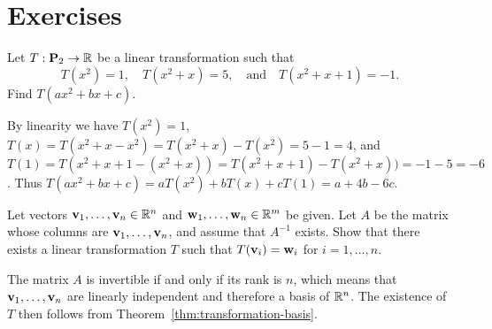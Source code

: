 \section*{Exercises}

\begin{ex}
  Let $T:\mathbf{P}_2 \to \mathbb{R}$ be a linear transformation such that
  \begin{equation*}
    T(x^2)=1,
    \quad
    T(x^2+x)=5,
    \quad\mbox{and}\quad
    T(x^2+x+1)=-1.
  \end{equation*}
  Find $T(ax^2+bx+c)$.
  \begin{sol}
    By linearity we have
    $T(x^2)=1$, $T(x) = T(x^2+x - x^2)= T(x^2+x) - T(x^2)= 5-1=4$, and
    $T(1) = T(x^2+x+1 -(x^2+x))=T(x^2+x+1) -T(x^2+x))= -1-5=-6$.
    Thus $T(ax^2+bx+c) = aT(x^2) + bT(x) + cT(1) = a+4b-6c$.
  \end{sol}
\end{ex}

\begin{ex}
  Let vectors $\vect{v}_1,\ldots,\vect{v}_n\in\R^n$ and
  $\vect{w}_1,\ldots,\vect{w}_n\in\R^m$ be given. Let $A$ be the
  matrix whose columns are $\vect{v}_1,\ldots,\vect{v}_n$, and assume
  that $A^{-1}$ exists. Show that there exists a linear transformation
  $T$ such that $T(\vect{v}_i)=\vect{w}_i$ for $i=1,\ldots,n$.
  \begin{sol}
    The matrix $A$ is invertible if and only if its rank is $n$, which
    means that $\vect{v}_1,\ldots,\vect{v}_n$ are linearly independent
    and therefore a basis of $\mathbb{R}^n$. The existence of $T$ then follows
    from Theorem~\ref{thm:transformation-basis}.
  \end{sol}
\end{ex}

